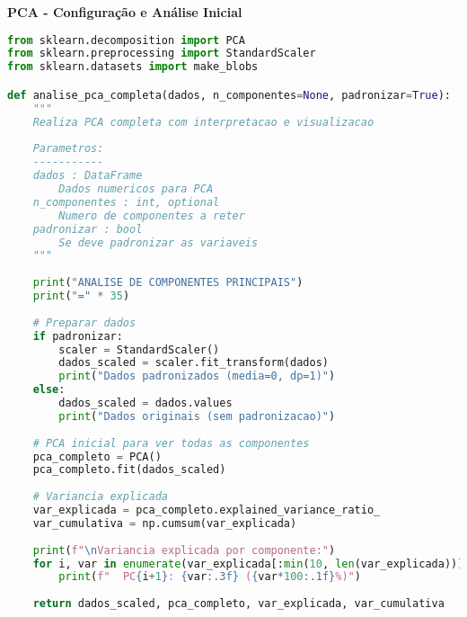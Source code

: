 \begin{researchbox}
\textbf{PCA - Configuração e Análise Inicial}

\begin{lstlisting}[language=Python]
from sklearn.decomposition import PCA
from sklearn.preprocessing import StandardScaler
from sklearn.datasets import make_blobs

def analise_pca_completa(dados, n_componentes=None, padronizar=True):
    """
    Realiza PCA completa com interpretacao e visualizacao
    
    Parametros:
    -----------
    dados : DataFrame
        Dados numericos para PCA
    n_componentes : int, optional
        Numero de componentes a reter
    padronizar : bool
        Se deve padronizar as variaveis
    """
    
    print("ANALISE DE COMPONENTES PRINCIPAIS")
    print("=" * 35)
    
    # Preparar dados
    if padronizar:
        scaler = StandardScaler()
        dados_scaled = scaler.fit_transform(dados)
        print("Dados padronizados (media=0, dp=1)")
    else:
        dados_scaled = dados.values
        print("Dados originais (sem padronizacao)")
    
    # PCA inicial para ver todas as componentes
    pca_completo = PCA()
    pca_completo.fit(dados_scaled)
    
    # Variancia explicada
    var_explicada = pca_completo.explained_variance_ratio_
    var_cumulativa = np.cumsum(var_explicada)
    
    print(f"\nVariancia explicada por componente:")
    for i, var in enumerate(var_explicada[:min(10, len(var_explicada))]):
        print(f"  PC{i+1}: {var:.3f} ({var*100:.1f}%)")
    
    return dados_scaled, pca_completo, var_explicada, var_cumulativa
\end{lstlisting}
\end{researchbox}

